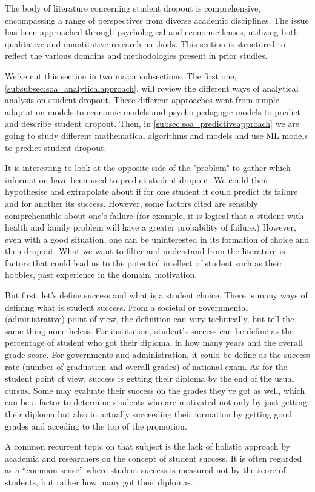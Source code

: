 \documentclass[../../main.tex]{subfiles}
\begin{document}
The body of literature concerning student dropout is comprehensive, encompassing a range of perspectives from diverse academic disciplines. The issue has been approached through psychological and economic lenses, utilizing both qualitative and quantitative research methods. This section is structured to reflect the various domains and methodologies present in prior studies.

We've cut this section in two major subsections. The first one, \ref{subsubsec:soa_analyticalapproach}, will review the different ways of analytical analysis on student dropout. These different approaches went from simple adaptation models to economic models and psycho-pedagogic models to predict and describe student dropout. Then, in \ref{subsec:soa_predictiveapproach} we are going to study different mathematical algorithms and models and use ML models to predict student dropout.

It is interesting to look at the opposite side of the "problem" to gather which information have been used to predict student dropout. We could then hypothesise and extrapolate about if for one student it could predict its failure and for another its success.
However, some factors cited are sensibly comprehensible about one's failure (for example, it is logical that a student with health and family problem will have a greater probability of failure.) However, even with a good situation, one can be uninterested in its formation of choice and then dropout. 
What we want to filter and understand from the literature is factors that could lead us to the potential intellect of student such as their hobbies, past experience in the domain, motivation.

But first, let's define success and what is a student choice. There is many ways of defining what is student success. From a societal or governmental (administrative) point of view, the definition can vary technically, but tell the same thing nonetheless. For institution, student's success can be define as the percentage of student who got their diploma, in how many years and the overall grade score. For governments and administration, it could be define as the success rate (number of graduation and overall grades) of national exam. As for the student point of view, success is getting their diploma by the end of the usual cursus. Some may evaluate their success on the grades they've got as well, which can be a factor to determine students who are motivated not only by just getting their diploma but also in actually succeeding their formation by getting good grades and acceding to the top of the promotion.

A common recurrent topic on that subject is the lack of holistic approach by academia and researchers on the concept of student success. It is often regarded as a “common sense” where student success is measured not by the score of students, but rather how many got their diplomas. \cite{weatherton_success_2021}.
\end{document}

